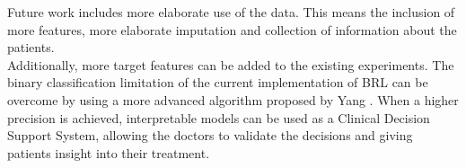 \documentclass[conference,compsoc]{IEEEtran}
\begin{document}
Future work includes more elaborate use of the data. 
This means the inclusion of more features, more elaborate imputation and collection of information about the patients. \\
Additionally, more target features can be added to the existing experiments. 
The binary classification limitation of the current implementation of BRL can be overcome by using a more advanced algorithm proposed by Yang \cite{Yang2016}.
When a higher precision is achieved, interpretable models can be used as a Clinical Decision Support System, allowing the doctors to validate the decisions and giving patients insight into their treatment.




\end{document}
